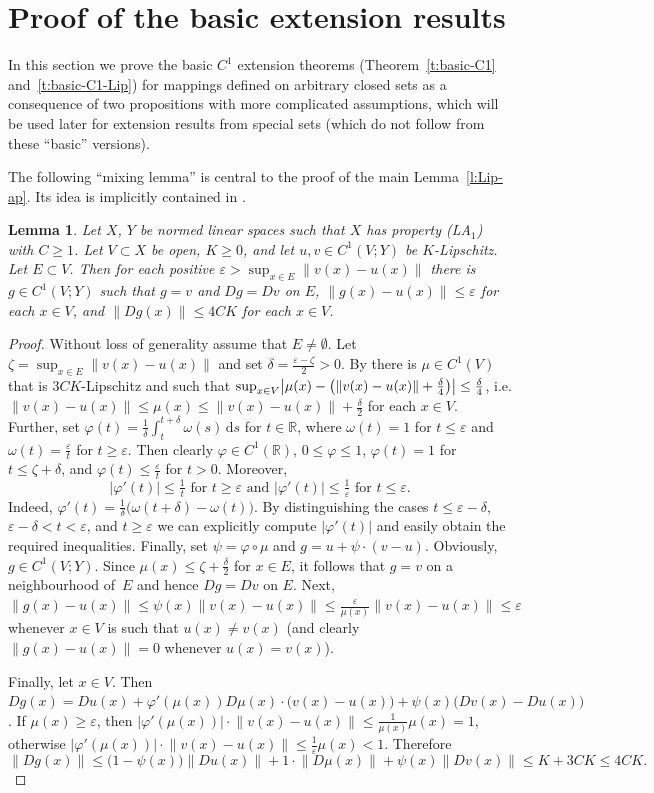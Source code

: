 \documentclass[a4paper,twoside,10pt,reqno,draft]{amsart}
\let\comp=\circ
\newtheorem{lemma}[theorem]{Lemma}
\theoremstyle{definition}
\theoremstyle{remark}
\newcommand\abs[1]{\mathopen|#1\mathclose|}
\newcommand\absb[2]{\csname#1l\endcsname|#2\csname#1r\endcsname|}
\newcommand\norm[1]{\mathopen\|#1\mathclose\|}
\newcommand\de{\delta}
\newcommand\ve{\varepsilon}
\newcommand\vp{\varphi}
\newcommand\om{\omega}
\newcommand\R{{\mathbb R}}
\renewcommand\d{\,\mathrm{d}}
\newcommand\pLA[1]{(LA$_#1$)}
\begin{document}
\section{Proof of the basic extension results}\label{sec:basic}

In this section we prove the basic $C^1$ extension theorems (Theorem~\ref{t:basic-C1} and~\ref{t:basic-C1-Lip}) for mappings defined on arbitrary closed sets as a consequence of two propositions with more complicated assumptions,
which will be used later for extension results from special sets (which do not follow from these ``basic'' versions).

The following ``mixing lemma'' is central to the proof of the main Lemma~\ref{l:Lip-ap}.
Its idea is implicitly contained in \cite[Proof of Lemma~2.3]{JS1}.

\begin{lemma}\label{l:mix-C1_Lip}
Let $X$, $Y$ be normed linear spaces such that $X$ has property \pLA1 with $C\ge1$.
Let $V\subset X$ be open, $K\ge0$, and let $u,v\in C^1(V;Y)$ be $K$-Lipschitz.
Let $E\subset V$.
Then for each positive $\ve>\sup_{x\in E}\norm{v(x)-u(x)}$ there is $g\in C^1(V;Y)$ such that $g=v$ and $Dg=Dv$ on $E$, $\norm{g(x)-u(x)}\le\ve$ for each $x\in V$, and $\norm{Dg(x)}\le4CK$ for each $x\in V$.
\end{lemma}
\begin{proof}
Without loss of generality assume that $E\neq\emptyset$.
Let $\zeta=\sup_{x\in E}\norm{v(x)-u(x)}$ and set $\de=\frac{\ve-\zeta}2>0$.
By \cite[Theorem~7.86]{HJ} there is $\mu\in C^1(V)$ that is $3CK$-Lipschitz and such that $\sup_{x\in V}\absb{big}{\mu(x)-\bigl(\norm{v(x)-u(x)}+\frac\de4\bigr)}\le\frac\de4$,
i.e. $\norm{v(x)-u(x)}\le\mu(x)\le\norm{v(x)-u(x)}+\frac\de2$ for each $x\in V$.
Further, set $\vp(t)=\frac1\de\int_t^{t+\de}\om(s)\d s$ for $t\in\R$, where $\om(t)=1$ for $t\le\ve$ and $\om(t)=\frac\ve t$ for $t\ge\ve$.
Then clearly $\vp\in C^1(\R)$, $0\le\vp\le1$, $\vp(t)=1$ for $t\le\zeta+\de$, and $\vp(t)\le\frac\ve t$ for $t>0$.
Moreover,
\[
\text{$\abs{\vp'(t)}\le\tfrac1t$ for $t\ge\ve$ and $\abs{\vp'(t)}\le\tfrac1\ve$ for $t\le\ve$.}
\]
Indeed, $\vp'(t)=\frac1\de\bigl(\om(t+\de)-\om(t)\bigr)$.
By distinguishing the cases $t\le\ve-\de$, $\ve-\de<t<\ve$, and $t\ge\ve$ we can explicitly compute $\abs{\vp'(t)}$ and easily obtain the required inequalities.
Finally, set $\psi=\vp\comp\mu$ and $g=u+\psi\cdot(v-u)$.
Obviously, $g\in C^1(V;Y)$.
Since $\mu(x)\le\zeta+\frac\de2$ for $x\in E$, it follows that $g=v$ on a neighbourhood of~$E$ and hence $Dg=Dv$ on $E$.
Next, $\norm{g(x)-u(x)}\le\psi(x)\norm{v(x)-u(x)}\le\frac\ve{\mu(x)}\norm{v(x)-u(x)}\le\ve$ whenever $x\in V$ is such that $u(x)\neq v(x)$
(and clearly $\norm{g(x)-u(x)}=0$ whenever $u(x)=v(x)$).

Finally, let $x\in V$.
Then $Dg(x)=Du(x)+\vp'(\mu(x))D\mu(x)\cdot\bigl(v(x)-u(x)\bigr)+\psi(x)\bigl(Dv(x)-Du(x)\bigr)$.
If $\mu(x)\ge\ve$, then $\abs{\vp'(\mu(x))}\cdot\norm{v(x)-u(x)}\le\frac1{\mu(x)}\mu(x)=1$, otherwise $\abs{\vp'(\mu(x))}\cdot\norm{v(x)-u(x)}\le\frac1\ve\mu(x)<1$.
Therefore
\[
\norm{Dg(x)}\le\bigl(1-\psi(x)\bigr)\norm{Du(x)}+1\cdot\norm{D\mu(x)}+\psi(x)\norm{Dv(x)}\le K+3CK\le4CK.
\]
\end{proof}
\end{document}
